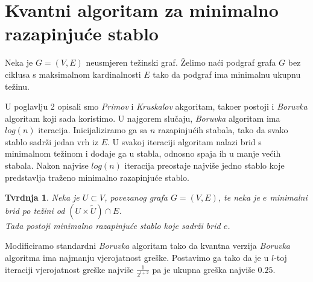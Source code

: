 \documentclass[a4paper,12pt]{article}
\newtheorem{tv}{Tvrdnja}
\begin{document}
\section{Kvantni algoritam za minimalno razapinju\'ce stablo}

Neka je $G=(V,E)$ neusmjeren te\v{z}inski graf. \v{Z}elimo na\'ci  podgraf grafa $G$ bez ciklusa s maksimalnom kardinalnosti $E$ tako da podgraf ima minimalnu ukupnu te\v{z}inu.

U poglavlju 2 opisali smo \emph{Primov} i \emph{Kruskalov} akgoritam, tako\dj{}er postoji i  \emph{Boruvka} algoritam koji sada koristimo. U najgorem slu\v{c}aju, \emph{Boruvka} algoritam ima $log(n)$ iteracija. Inicijaliziramo ga sa $n$ razapinju\'cih stabala, tako da svako stablo sadr\v{z}i jedan vrh iz $E$. U svakoj iteraciji algoritam nalazi brid s minimalnom te\v{z}inom  i dodaje ga u stabla, odnosno spaja ih u manje ve\'cih stabala. Nakon najvise $log(n)$ iteracija preostaje najvi\v{s}e jedno stablo koje predstavlja tra\v{z}eno minimalno razapinju\'ce stablo.

\begin{tv}
Neka je $U\subset V$, povezanog grafa $G=(V,E)$, te neka je $e$ minimalni brid po te\v{z}ini od $(U\times \tilde{U})\cap E$.\\
Tada postoji minimalno razapinju\'ce stablo koje sadr\v{z}i brid $e$.
\end{tv}

Modificiramo standardni \emph{Boruvka} algoritam tako da kvantna verzija  \emph{Boruvka} algoritma ima najmanju vjerojatnost gre\v{s}ke. Postavimo ga tako da je u $l$-toj iteraciji vjerojatnost gre\v{s}ke najvi\v{s}e $ \frac{1}{2^{l+2}}$ pa je ukupna gre\v{s}ka najvi\v{s}e $0.25$.\\
\end{document}
